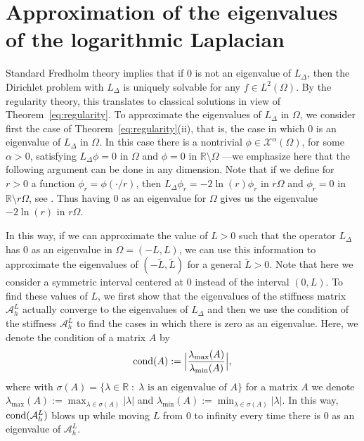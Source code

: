 \documentclass[11 pt]{article}
\numberwithin{equation}{section}
\def\tilde{\widetilde}
\def\R{\mathbb{R}}
\begin{document}
\section{Approximation of the eigenvalues of the logarithmic Laplacian}\label{eigenvalue approximation:sec}

Standard Fredholm theory implies that if $0$ is not an eigenvalue of $L_\Delta$, then the Dirichlet problem with $L_{\Delta}$ is uniquely solvable for any $f\in L^2(\Omega)$. By the regularity theory, this translates to classical solutions in view of  Theorem~\ref{eq:regularity}. To approximate the eigenvalues of $L_{\Delta}$ in $\Omega$, we consider first the case of Theorem~\ref{eq:regularity}(ii), that is, the case in which $0$ is an eigenvalue of $L_{\Delta}$ in $\Omega$. In this case there is a nontrivial $\phi\in \mathcal X^{\alpha}(\Omega)$, for some $\alpha>0$, satisfying $L_{\Delta}\phi=0$ in  $\Omega$ and $\phi=0$ in $\R\setminus \Omega$ ---we emphasize here that the following argument can be done in any dimension. Note that if we define for $r>0$ a function $\phi_r=\phi(\cdot/r)$, then $L_{\Delta}\phi_r=-2\ln(r)\phi_r$ in $r\Omega$ and $\phi_r=0$ in $\R\setminus r\Omega$, see \cite[Lemma 2.5]{LW21}. Thus having $0$ as an eigenvalue for $\Omega$ gives us the eigenvalue $-2\ln(r)$ in $r\Omega$.

In this way, if we can approximate the value of $L>0$ such that the operator $L_{\Delta}$ has $0$ as an eigenvalue in $\Omega=(-L,L)$, we can use this information to approximate the eigenvalues of $(-\tilde{L},\tilde{L})$ for a general $\tilde{L}>0$. Note that here we consider a symmetric interval centered at $0$ instead of the interval $(0,L)$. To find these values of $L$, we first show that the eigenvalues of the stiffness matrix $\mathcal A_h^L$ actually converge to the eigenvalues of $L_{\Delta}$ and then we use the condition of the stiffness $\mathcal{A}^L_h$ to find the cases in which there is zero as an eigenvalue. Here, we denote the condition of a matrix $A$ by
\begin{equation}\label{defi:condition}
\textnormal{cond}(A):=\Big|\frac{\lambda_{\max}(A)}{\lambda_{\min}(A)}\Big|,
\end{equation}
where with $\sigma(A)=\{\lambda\in \R\;:\; \lambda\text{ is an eigenvalue of $A$}\}$ for a matrix $A$ we denote $\lambda_{\max}(A):=\max_{\lambda\in \sigma(A)}|\lambda|$ and $\lambda_{\min}(A):=\min_{\lambda\in \sigma(A)}|\lambda|.$ In this way, $\textnormal{cond}(\mathcal{A}^L_h)$ blows up while moving $L$ from $0$ to infinity every time there is $0$ as an eigenvalue of $\mathcal{A}^L_h$.
\end{document}
